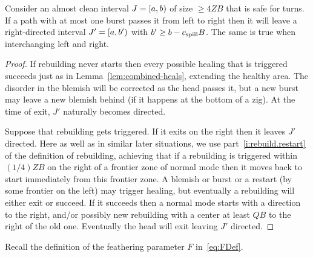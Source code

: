 \documentclass[11pt]{memoir}
\theoremstyle{definition} %
\renewcommand{\ge}{\geq}
\def\B{B}
\newcommand{\F}{F}
\newcommand{\passno}{\pi}
\newcommand{\Q}{Q} %
\newcommand{\Z}{Z} %
\newcommand{\cns}[1]{c_{\textrm{\upshape #1}}}
\newcommand{\CSpill}{\cns{spill}}
\begin{document}
\begin{lemma}\label{lem:make-directed}
  Consider an almost clean interval \( J=\left[a,b\right) \) of size \( \ge 4\Z\B \) that
  is safe for turns.
  If a path with at most one burst passes it
  from left to right then it will leave a right-directed interval \( J'=\left[a,b'\right) \) with 
  \( b'\ge b-\CSpill\B \).
  The same is true when interchanging left and right.
\end{lemma}
\begin{proof}
  \begin{sloppypar}
  If rebuilding never starts then every possible healing that is triggered succeeds just as
  in Lemma~\ref{lem:combined-heals}, extending the healthy area.
  The disorder in the blemish will be corrected as the head passes it, but
  a new burst may leave a new blemish behind (if it happens at the bottom of a zig).
  At the time of exit, \( J' \) naturally becomes directed.    
  \end{sloppypar}

  Suppose that rebuilding gets triggered.
  If it exits on the right then it leaves \( J' \) directed.
  Here as well as in similar later situations,
  we use part~\eqref{i:rebuild.restart} of the definition of rebuilding,
  achieving that if a rebuilding is triggered within \( (1/4)\Z\B \) on the right of a frontier zone
  of normal mode then it moves back to start immediately from this frontier zone.
  A blemish or burst or a restart (by some frontier on the left)
  may trigger healing, but eventually a rebuilding will either exit or succeed.
  If it succeeds then a normal mode starts with a direction to the right,
  and/or possibly new rebuilding with a center at least
  \( \Q\B \) to the right of the old one.
  Eventually the head will exit leaving \( J' \) directed.
\end{proof}


Recall the definition of the feathering parameter \( \F \) in~\eqref{eq:FDef}.
\end{document}
